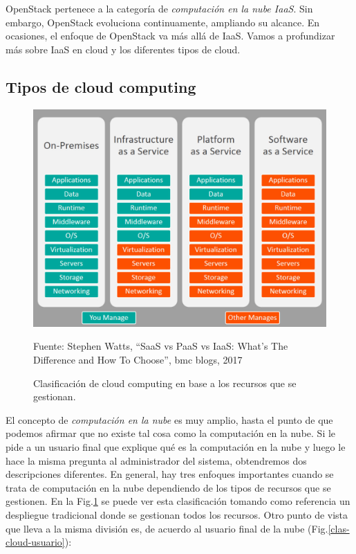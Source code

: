 OpenStack pertenece a la categoría de\textit{ computación en la nube IaaS}. Sin embargo, OpenStack evoluciona continuamente, ampliando su alcance. En ocasiones, el enfoque de OpenStack va más allá de IaaS.
Vamos a profundizar más sobre IaaS en cloud y los diferentes tipos de cloud.

\subsection{Tipos de cloud computing}

\begin{figure}[!ht]  \centering
    \includegraphics[width=1\textwidth]{imagenes/capitulo1/iaas-paas-saas-comparison.png}
    \caption{Clasificación de cloud computing en base a los recursos que se gestionan.}
	\vspace{0.3cm}
    \footnotesize{Fuente: Stephen Watts, “SaaS vs PaaS vs IaaS: What’s The Difference and How To Choose”, bmc blogs, 2017}    
    \label{comparacion-cloud}
\end{figure}

El concepto de \textit{computación en la nube} es muy amplio, hasta el punto de que podemos afirmar que no existe tal cosa como la computación en la nube. Si le pide a un usuario final que explique qué es la computación en la nube y luego le hace la misma pregunta al administrador del sistema, obtendremos dos descripciones diferentes. En general, hay tres enfoques importantes cuando se trata de computación en la nube dependiendo de los tipos de recursos que se gestionen. En la Fig.\ref{comparacion-cloud} se puede ver esta clasificación tomando como referencia un despliegue tradicional donde se gestionan todos los recursos. Otro punto de vista que lleva a la misma división es, de acuerdo al usuario final de la nube (Fig.\ref{clas-cloud-usuario}):

